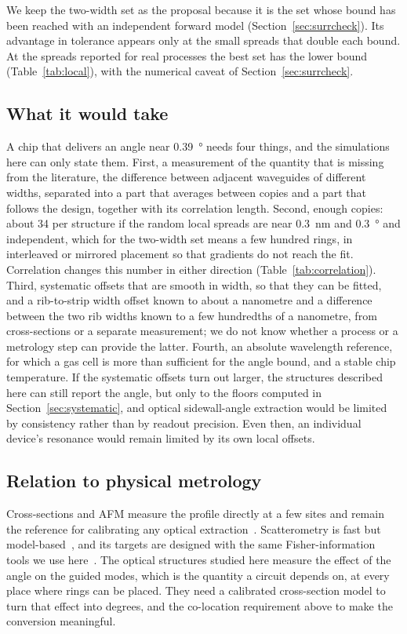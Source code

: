 We keep the two-width set as the proposal because it is the set whose bound has been reached with an independent forward model
(Section~\ref{sec:surrcheck}). Its advantage in tolerance appears only at the small spreads that double each bound. At the spreads reported for real processes
the best set has the lower bound (Table~\ref{tab:local}), with the numerical caveat of Section~\ref{sec:surrcheck}.

\subsection{What it would take}

A chip that delivers an angle near \qty{0.39}{\degree} needs four things, and the simulations here can only state them. First, a measurement of the quantity
that is missing from the literature, the difference between adjacent waveguides of different widths, separated into a part that averages between copies and a part
that follows the design, together with its correlation length. Second, enough copies: about 34 per structure if the random local spreads are near
\qty{0.3}{nm} and \qty{0.3}{\degree} and independent, which for the two-width set means a few hundred rings, in interleaved or mirrored placement
so that gradients do not reach the fit. Correlation changes this number in either direction (Table~\ref{tab:correlation}). Third, systematic
offsets that are smooth in width, so that they can be fitted, and a rib-to-strip width offset known to about a nanometre and a difference
between the two rib widths known to a few hundredths of a nanometre, from cross-sections or a separate measurement; we do not know whether a
process or a metrology step can provide the latter. Fourth, an absolute wavelength reference, for which a gas cell is more than sufficient for
the angle bound, and a stable chip temperature. If the systematic offsets turn out larger, the structures described here can still report the
angle, but only to the floors computed in Section~\ref{sec:systematic}, and optical sidewall-angle extraction would be limited by consistency
rather than by readout precision. Even then, an individual device's resonance would remain limited by its own local offsets.

\subsection{Relation to physical metrology}

Cross-sections and AFM measure the profile directly at a few sites and remain the reference for calibrating any
optical extraction~\cite{orji2018,yoo2022}. Scatterometry is fast but model-based~\cite{raymond2005}, and its targets
are designed with the same Fisher-information tools we use here~\cite{klein2025,silver2007}. The optical structures
studied here measure the effect of the angle on the guided modes, which is the quantity a circuit depends on, at
every place where rings can be placed. They need a calibrated cross-section model to turn that effect into degrees,
and the co-location requirement above to make the conversion meaningful.

